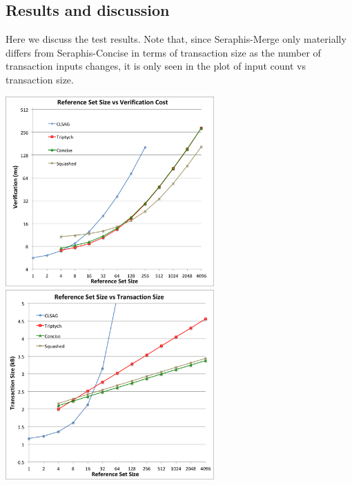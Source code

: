 \subsection{Results and discussion}
\label{subsec:efficiency-results-discussion}

Here we discuss the test results. Note that, since Seraphis-Merge only materially differs from Seraphis-Concise in terms of transaction size as the number of transaction inputs changes, it is only seen in the plot of input count vs transaction size.

\begin{center}
    \includegraphics[width=8cm]{figures/refset_1batch_ver.png}
    \includegraphics[width=8cm]{figures/refset_1batch_size.png}
    \label{figure:efficiency-refsetsize-ver}
    \label{figure:efficiency-refsetsize-size}
\end{center}

